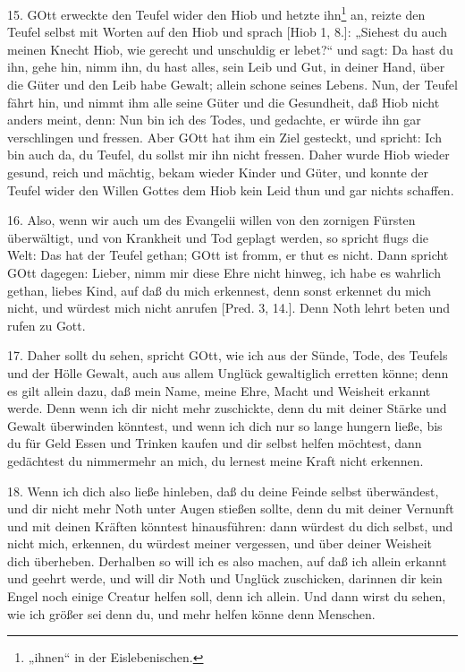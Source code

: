 15. GOtt erweckte den Teufel wider den Hiob und hetzte ihn\footnote{„ihnen“ in der Eislebenischen.} an, reizte den Teufel selbst mit
Worten auf den Hiob und sprach [Hiob 1, 8.]: „Siehest du auch meinen Knecht Hiob, wie gerecht und unschuldig er lebet?“ und sagt: Da hast du ihn, gehe hin, nimm ihn, du hast alles, sein Leib und Gut, in deiner Hand, über die Güter und den Leib habe Gewalt; allein schone seines Lebens. Nun, der Teufel fährt hin, und nimmt ihm alle seine Güter und die Gesundheit, daß Hiob nicht anders meint, denn: Nun bin ich des Todes, und gedachte, er würde ihn gar verschlingen und fressen. Aber GOtt hat ihm ein Ziel gesteckt, und spricht: Ich bin auch da, du Teufel, du sollst mir ihn nicht fressen. Daher wurde Hiob wieder gesund, reich und mächtig, bekam wieder Kinder und Güter, und konnte der Teufel wider den Willen Gottes dem Hiob kein Leid thun und gar nichts schaffen.

16. Also, wenn wir auch um des Evangelii willen von den zornigen Fürsten überwältigt, und von Krankheit und Tod geplagt werden, so spricht flugs die Welt: Das hat der Teufel gethan; GOtt ist fromm, er thut es nicht. Dann spricht GOtt dagegen: Lieber, nimm mir diese Ehre nicht hinweg, ich habe es wahrlich gethan, liebes Kind, auf daß du mich erkennest, denn sonst erkennet du mich nicht, und würdest mich nicht anrufen [Pred. 3, 14.]. Denn Noth lehrt beten und rufen zu Gott.

17. Daher sollt du sehen, spricht GOtt, wie ich aus der Sünde, Tode, des Teufels und der Hölle Gewalt, auch aus allem Unglück gewaltiglich erretten könne; denn es gilt allein dazu, daß mein Name, meine Ehre, Macht und Weisheit erkannt werde. Denn wenn ich dir nicht mehr zuschickte, denn du mit deiner Stärke und Gewalt überwinden könntest, und wenn ich dich nur so lange hungern ließe, bis du für Geld Essen und Trinken kaufen und dir selbst helfen möchtest, dann gedächtest du nimmermehr an mich, du lernest meine Kraft nicht erkennen.

18. Wenn ich dich also ließe hinleben, daß du deine Feinde selbst überwändest, und dir nicht mehr Noth unter Augen stießen sollte, denn du mit deiner Vernunft und mit deinen Kräften könntest hinausführen: dann würdest du dich selbst, und nicht mich, erkennen, du würdest meiner vergessen, und über deiner Weisheit dich überheben. Derhalben so will ich es also machen, auf daß ich allein erkannt und geehrt werde, und will dir Noth und Unglück zuschicken, darinnen dir kein Engel noch einige Creatur helfen soll, denn ich allein. Und dann wirst du sehen, wie ich größer sei denn du, und mehr helfen könne denn Menschen.

